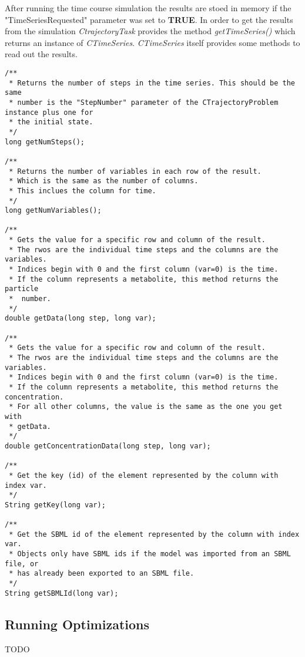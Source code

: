 \documentclass[a4,12pt]{article}
\begin{document}
After running the time course simulation the results are stoed in memory if the "TimeSeriesRequested" parameter was set to \textbf{TRUE}. In order to get the results from the simulation \textit{CtrajectoryTask} provides the method \textit{getTimeSeries()} which returns an instance of \textit{CTimeSeries}.
\textit{CTimeSeries} itself provides some methods to read out the results.

\begin{lstlisting}
/**
 * Returns the number of steps in the time series. This should be the same
 * number is the "StepNumber" parameter of the CTrajectoryProblem instance plus one for
 * the initial state.
 */
long getNumSteps();

/**
 * Returns the number of variables in each row of the result.
 * Which is the same as the number of columns.
 * This inclues the column for time.
 */
long getNumVariables();

/**
 * Gets the value for a specific row and column of the result.
 * The rwos are the individual time steps and the columns are the variables.
 * Indices begin with 0 and the first column (var=0) is the time.
 * If the column represents a metabolite, this method returns the particle
 *  number.
 */
double getData(long step, long var);

/**
 * Gets the value for a specific row and column of the result.
 * The rwos are the individual time steps and the columns are the variables.
 * Indices begin with 0 and the first column (var=0) is the time.
 * If the column represents a metabolite, this method returns the concentration.
 * For all other columns, the value is the same as the one you get with
 * getData.
 */
double getConcentrationData(long step, long var);

/**
 * Get the key (id) of the element represented by the column with index var.
 */
String getKey(long var);

/**
 * Get the SBML id of the element represented by the column with index var.
 * Objects only have SBML ids if the model was imported from an SBML file, or
 * has already been exported to an SBML file.
 */
String getSBMLId(long var);
\end{lstlisting}

\subsection{Running Optimizations}
TODO
\end{document}

